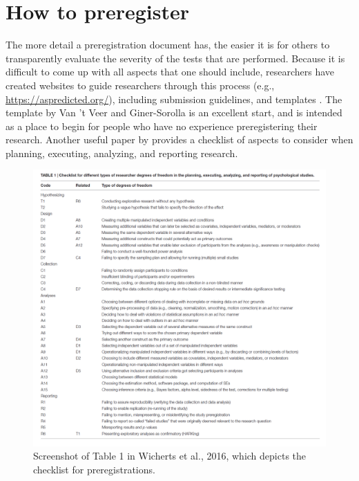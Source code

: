 \documentclass[
  oneside]{krantz}
\begin{document}
\hypertarget{how-to-preregister}{%
\section{How to preregister}\label{how-to-preregister}}

The more detail a preregistration document has, the easier it is for others to transparently evaluate the severity of the tests that are performed. Because it is difficult to come up with all aspects that one should include, researchers have created websites to guide researchers through this process (e.g., \url{https://aspredicted.org/}), including submission guidelines, and templates \citep{van_t_veer_pre-registration_2016}. The template by Van 't Veer and Giner-Sorolla is an excellent start, and is intended as a place to begin for people who have no experience preregistering their research. Another useful paper by \citet{wicherts_degrees_2016} provides a checklist of aspects to consider when planning, executing, analyzing, and reporting research.



\begin{figure}

{\centering \includegraphics[width=1\linewidth]{images/preregchecklist} 

}

\caption{Screenshot of Table 1 in Wicherts et al., 2016, which depicts the checklist for preregistrations.}\label{fig:preregcheclist}
\end{figure}
\end{document}
